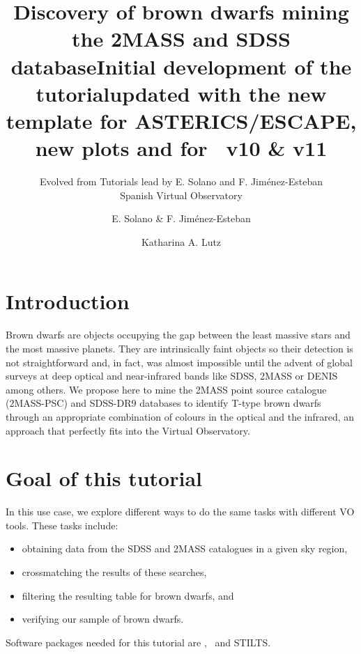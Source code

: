 \documentclass [a4paper, 12pt]{article}
\begin{document}
\author{Evolved from Tutorials lead by E. Solano and F. Jim\'enez-Esteban \\      %
Spanish Virtual Observatory}       %
\title{Discovery of brown dwarfs mining the 2MASS and SDSS database}   %
\makeescapetitle

\newpage
\author{E. Solano \& F. Jim\'enez-Esteban}   %
\title{Initial development of the tutorial}  %
\addescapehistory
\author{Katharina A. Lutz}
\title{updated with the new template for ASTERICS/ESCAPE, new plots and for \aladin\
v10 \& v11}
\addescapehistory

\newpage
\tableofcontents

\newpage
\section{Introduction}
Brown dwarfs are objects occupying the gap between the least massive
stars and the most massive planets. They are intrinsically faint objects so
their detection is not straightforward and, in fact, was almost impossible
until the advent of global surveys at deep optical and near-infrared bands like
SDSS, 2MASS or DENIS among others. We propose here to mine the 2MASS point
source catalogue (2MASS-PSC) and
SDSS-DR9 databases to identify T-type brown dwarfs through an appropriate
combination of colours in the optical and the infrared, an approach that
perfectly fits into the Virtual
Observatory.

\section{Goal of this tutorial}
In this use case, we explore different ways to do the same tasks with different
VO tools. These tasks include:
\begin{itemize}
\item obtaining data from the SDSS and 2MASS catalogues in a given sky region,
\item crossmatching the results of these searches,
\item filtering the resulting table for brown dwarfs, and
\item verifying our sample of brown dwarfs.
\end{itemize}
\noindent Software packages needed for this tutorial are \aladin, \topcat\ and
STILTS.
\end{document}
